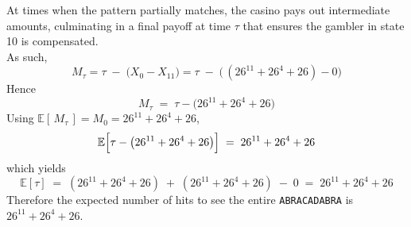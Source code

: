 \documentclass{article}
\begin{document}
\begin{enumerate}
{At times when the pattern partially matches, the casino pays out intermediate amounts, culminating in a final payoff at time $\tau$ that ensures the gambler in state 10 is compensated. \\
As such,
\[
M_{\tau} 
= 
\tau \;-\; \bigl(X_0 - X_{11}\bigr)
= 
\tau \;-\; \bigl(\,(26^{11} + 26^4 + 26) - 0\bigr)
\]
Hence
\[
M_{\tau}
\;=\;
\tau - \bigl(26^{11} + 26^4 + 26\bigr)
\]
Using $\mathbb{E}[\,M_{\tau}\,] = M_0 = 26^{11}+26^4+26$,
\[
\mathbb{E}\Bigl[\tau - \bigl(26^{11} + 26^4 + 26\bigr)\Bigr]
\;=\;
26^{11} + 26^4 + 26
\]
which yields 
\[
\mathbb{E}[\tau]
\;=\;
(26^{11} + 26^4 + 26) \;+\; (26^{11} + 26^4 + 26)
\;-\; 0
\;=\;
26^{11} + 26^4 + 26
\]
Therefore the expected number of hits to see the entire \texttt{ABRACADABRA} is 
$26^{11} + 26^4 + 26$.
    }

\end{enumerate}
\end{document}
